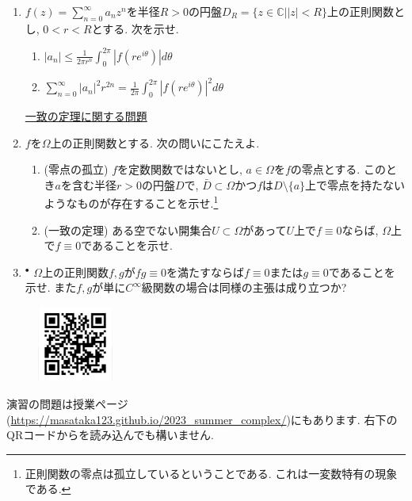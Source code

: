 \documentclass[dvipdfmx,a4paper,11pt]{article}
\newcommand{\N}{\mathbb{N}}
\newcommand{\C}{\mathbb{C}}
\theoremstyle{definition}
\begin{document}
\begin{enumerate}[label=\textbf{問}3.\arabic*]
\item $f(z) = \sum_{n=0}^{\infty} a_n z^n$を半径$R>0$の円盤$D_{R} = \{ z \in \C | |z|<R\}$上の正則関数とし, $0< r < R$とする. 次を示せ.
 \begin{enumerate}
\setlength{\parskip}{0cm} 
  \setlength{\itemsep}{0cm} 
  \item $|a_n| \le \frac{1}{2 \pi r^n} \int_{0}^{2 \pi} |f(r e^{i \theta})| d \theta$
  \item  $\sum_{n=0}^{\infty} |a_n|^2 r^{2n} =\frac{1}{2 \pi} \int_{0}^{2 \pi} |f(r e^{i \theta})|^2 d \theta$
  \end{enumerate}
  
\newpage 
  
   \vspace{12pt}
\hspace{-36pt}\underline{一致の定理に関する問題} 
  
    \item $f$を$\Omega$上の正則関数とする.  次の問いにこたえよ.
     \begin{enumerate}
\setlength{\parskip}{0cm} 
  \setlength{\itemsep}{0cm} 
   \item (零点の孤立) $f$を定数関数ではないとし, $a \in \Omega$を$f$の零点とする. 
   このとき$a$を含む半径$r > 0$の円盤$D$で, $\bar{D} \subset \Omega$かつ$f$は$D \setminus \{ a\}$上で零点を持たないようなものが存在することを示せ.\footnote{正則関数の零点は孤立しているということである. これは一変数特有の現象である. }
     \item (一致の定理) ある空でない開集合$U \subset \Omega$があって$U$上で$f \equiv 0$ならば, $\Omega$上で$f \equiv0$であることを示せ. 
     
   \end{enumerate}
   \item $^{\bullet}$ $\Omega$上の正則関数$f,g$が$fg \equiv 0$を満たすならば$f \equiv 0$または$g \equiv 0$であることを示せ. また$f,g$が単に$C^{\infty}$級関数の場合は同様の主張は成り立つか?
   
 \end{enumerate}
 


 
 \vspace{11pt}\begin{figure}  \centering\includegraphics[height=25mm, width=25mm]{complex.png}\end{figure}

演習の問題は授業ページ(\url{https://masataka123.github.io/2023_summer_complex/})にもあります. 右下のQRコードからを読み込んでも構いません.


  
  
 
\end{document}
